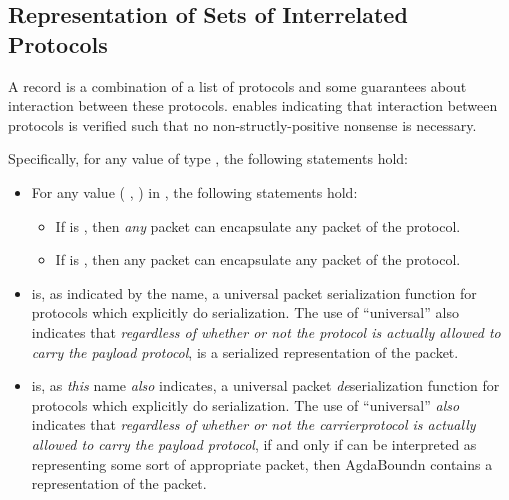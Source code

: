 \documentclass{report}
\begin{document}
\begin{itemize}
\chapter{Representation of Sets of Interrelated Protocols}
A  record is a combination of a list of protocols and some guarantees about interaction between these protocols.   enables indicating that interaction between protocols is verified such that no non-structly-positive nonsense is necessary.

Specifically, for any value  of type  , the following statements hold:
\begin{itemize}
	\item For any value \AgdaSymbol( \AgdaSymbol , \AgdaSymbol) in  , the following statements hold:
	\begin{itemize}
		\item If  is , then \emph{any} packet can encapsulate any packet of the  protocol.
		\item If  is  , then any  packet can encapsulate any packet of the  protocol.
	\end{itemize}
	\item {}  is, as indicated by the name, a universal packet serialization function for protocols which explicitly do serialization.  The use of ``universal'' also indicates that \emph{regardless of whether or not the  protocol is actually allowed to carry the payload protocol},  \AgdaUnderscore{}  \AgdaUnderscore{} \AgdaUnderscore{} \AgdaUnderscore{} is a serialized representation of the  packet.
	\item {}  is, as \emph{this} name \emph{also} indicates, a universal packet \emph{de}serialization function for protocols which explicitly do serialization.  The use of ``universal'' \emph{also} indicates that \emph{regardless of whether or not the carrierprotocol is actually allowed to carry the payload protocol}, if and only if  can be interpreted as representing some sort of appropriate packet, then  \AgdaUnderscore{} AgdaBound{n} contains a representation of the  packet.

\end{itemize}
\end{itemize}
\end{document}
